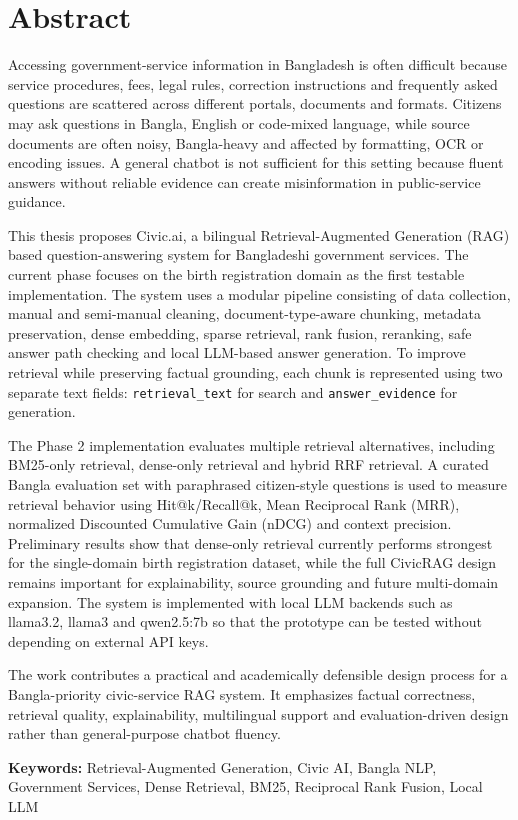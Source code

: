 \section*{Abstract}

Accessing government-service information in Bangladesh is often difficult because service procedures, fees, legal rules, correction instructions and frequently asked questions are scattered across different portals, documents and formats. Citizens may ask questions in Bangla, English or code-mixed language, while source documents are often noisy, Bangla-heavy and affected by formatting, OCR or encoding issues. A general chatbot is not sufficient for this setting because fluent answers without reliable evidence can create misinformation in public-service guidance.

This thesis proposes Civic.ai, a bilingual Retrieval-Augmented Generation (RAG) based question-answering system for Bangladeshi government services. The current phase focuses on the birth registration domain as the first testable implementation. The system uses a modular pipeline consisting of data collection, manual and semi-manual cleaning, document-type-aware chunking, metadata preservation, dense embedding, sparse retrieval, rank fusion, reranking, safe answer path checking and local LLM-based answer generation. To improve retrieval while preserving factual grounding, each chunk is represented using two separate text fields: \texttt{retrieval\_text} for search and \texttt{answer\_evidence} for generation.

The Phase 2 implementation evaluates multiple retrieval alternatives, including BM25-only retrieval, dense-only retrieval and hybrid RRF retrieval. A curated Bangla evaluation set with paraphrased citizen-style questions is used to measure retrieval behavior using Hit@k/Recall@k, Mean Reciprocal Rank (MRR), normalized Discounted Cumulative Gain (nDCG) and context precision. Preliminary results show that dense-only retrieval currently performs strongest for the single-domain birth registration dataset, while the full CivicRAG design remains important for explainability, source grounding and future multi-domain expansion. The system is implemented with local LLM backends such as llama3.2, llama3 and qwen2.5:7b so that the prototype can be tested without depending on external API keys.

The work contributes a practical and academically defensible design process for a Bangla-priority civic-service RAG system. It emphasizes factual correctness, retrieval quality, explainability, multilingual support and evaluation-driven design rather than general-purpose chatbot fluency.

\vspace{1cm}
\textbf{Keywords:} Retrieval-Augmented Generation, Civic AI, Bangla NLP, Government Services, Dense Retrieval, BM25, Reciprocal Rank Fusion, Local LLM
\pagebreak
